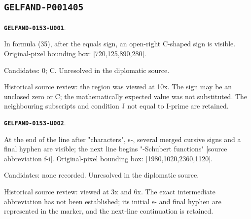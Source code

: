 \documentclass[11pt]{article}
\theoremstyle{definition}
\theoremstyle{remark}
\begin{document}
\subsection*{\texttt{GELFAND-P001405}}
\par\noindent\leavevmode{}\label{GELFAND-0153-U001}\label{GELFAND-P001405:pairing-value:note}\textbf{\texttt{GELFAND-0153-U001}}.\nopagebreak[4]\par
In formula (35), after the equals sign, an open-right C-shaped sign is visible. Original-pixel bounding box: [720,125,890,280].\par
Candidates: 0; C. Unresolved in the diplomatic source.\par
Historical source review: the region was viewed at 10x. The sign may be an unclosed zero or C; the mathematically expected value was not substituted. The neighbouring subscripts and condition J not equal to I-prime are retained.\par\medskip
\par\noindent\leavevmode{}\label{GELFAND-0153-U002}\label{GELFAND-P001405:characters-line-ending:note}\textbf{\texttt{GELFAND-0153-U002}}.\nopagebreak[4]\par
At the end of the line after "characters", s-, several merged cursive signs and a final hyphen are visible; the next line begins "-Schubert functions" [source abbreviation f-i]. Original-pixel bounding box: [1980,1020,2360,1120].\par
Candidates: none recorded. Unresolved in the diplomatic source.\par
Historical source review: viewed at 3x and 6x. The exact intermediate abbreviation has not been established; its initial s- and final hyphen are represented in the marker, and the next-line continuation is retained.\par\medskip
\end{document}
